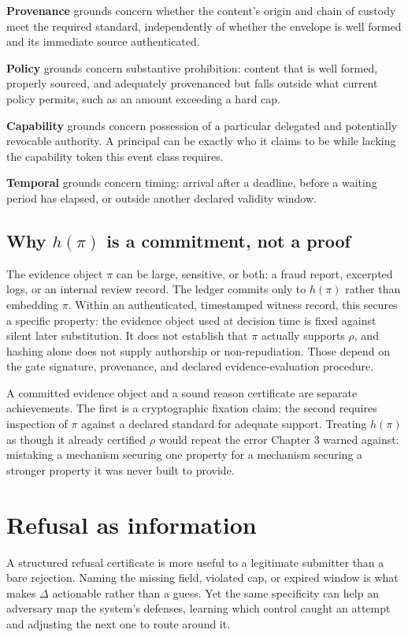 \documentclass[11pt,openany]{book}
\begin{document}
\textbf{Provenance} grounds concern whether the content's origin and chain of
custody meet the required standard, independently of whether the envelope is
well formed and its immediate source authenticated.

\textbf{Policy} grounds concern substantive prohibition: content that is well
formed, properly sourced, and adequately provenanced but falls outside what
current policy permits, such as an amount exceeding a hard cap.

\textbf{Capability} grounds concern possession of a particular delegated and
potentially revocable authority. A principal can be exactly who it claims to
be while lacking the capability token this event class requires.

\textbf{Temporal} grounds concern timing: arrival after a deadline, before a
waiting period has elapsed, or outside another declared validity window.

\subsection{Why \texorpdfstring{\(h(\pi)\)}{h(pi)} is a commitment, not a proof}

The evidence object \(\pi\) can be large, sensitive, or both: a fraud report,
excerpted logs, or an internal review record. The ledger commits only to
\(h(\pi)\) rather than embedding \(\pi\). Within an authenticated, timestamped
witness record, this secures a specific property: the evidence object used at
decision time is fixed against silent later substitution. It does not establish
that \(\pi\) actually supports \(\rho\), and hashing alone does not supply
authorship or non-repudiation. Those depend on the gate signature, provenance,
and declared evidence-evaluation procedure.

A committed evidence object and a sound reason certificate are separate
achievements. The first is a cryptographic fixation claim; the second requires
inspection of \(\pi\) against a declared standard for adequate support.
Treating \(h(\pi)\) as though it already certified \(\rho\) would repeat the
error Chapter 3 warned against: mistaking a mechanism securing one property
for a mechanism securing a stronger property it was never built to provide.

\section{Refusal as information}

A structured refusal certificate is more useful to a legitimate submitter than
a bare rejection. Naming the missing field, violated cap, or expired window is
what makes \(\Delta\) actionable rather than a guess. Yet the same specificity
can help an adversary map the system's defenses, learning which control caught
an attempt and adjusting the next one to route around it.
\end{document}
